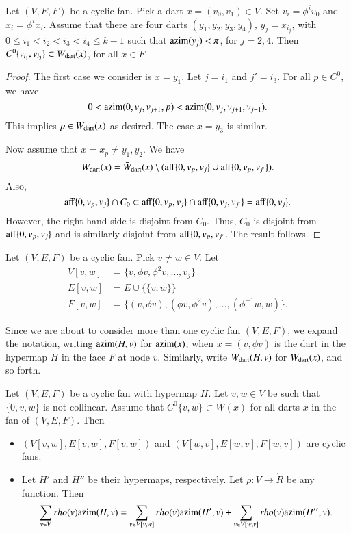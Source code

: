 \begin{lemma}  Let $(V,E,F)$ be a cyclic fan.  Pick a dart $x=(v_0,v_1)\in V$.  Set $v_i = \phi^i v_0$ and $x_i = \phi^i x_i$.  Assume that there are four darts $(y_1,y_2,y_3,y_4)$, $y_j = x_{i_j}$, with
$0\le i_1 < i_2 < i_3 < i_4\le k-1$ 
such that ${\operatorname{azim}}(y_j) < \pi$, for $j=2,4$.  
Then $C^0\{v_{i_1},v_{i_3}\} \subset W_{\text{dart}}(x)$, for all $x\in F$.
\end{lemma}

\begin{proof} The first case we consider is $x=y_1$.  Let $j=i_1$ and $j' = i_3$. For all $p\in C^0$, we have
$$
0 < {\operatorname{azim}}(0,v_{j},v_{j+1},p) < {\operatorname{azim}}(0,v_j,v_{j+1},v_{j-1}).
$$  
This implies $p\in W_{\text{dart}}(x)$ as desired.  The case $x=y_3$ is similar.

Now assume that $x=x_p\ne y_1,y_2$.  We have
$$
W_{\text{dart}}(x) = \bar W_{\text{dart}}(x)\setminus ({\operatorname{aff}}\{0,v_p,v_j\}\cup{\operatorname{aff}}\{0,v_p,v_{j'}\}).
$$
Also, 
$$
{\operatorname{aff}}\{0,v_p,v_j\}\cap C_0 \subset {\operatorname{aff}}\{0,v_p,v_j\}\cap {\operatorname{aff}}\{0,v_j,v_{j'}\} = {\operatorname{aff}}\{0,v_j\}.
$$
However, the right-hand side is disjoint from $C_0$.  Thus, $C_0$ is disjoint from ${\operatorname{aff}}\{0,v_p,v_j\}$ and is similarly disjoint from ${\operatorname{aff}}\{0,v_p,v_{j'}$.  The result follows.
\end{proof}

\begin{definition} Let $(V,E,F)$ be a cyclic fan.  Pick $v\ne w\in V$.
Let
$$
\begin{array}{lll}
V[v,w] &= \{v,\phi v,\phi^2 v,\ldots,v_j\}\\
E[v,w] &= E \cup \{\{v,w\}\}\\
F[v,w] &= \{(v,\phi v),(\phi v,\phi^2 v),\ldots,(\phi^{-1}w,w)\}.
\end{array}
$$
\end{definition}

Since we are about to consider more than one cyclic fan $(V,E,F)$, we expand the notation, writing ${\operatorname{azim}}(H,v)$ for ${\operatorname{azim}}(x)$, when $x=(v,\phi v)$ is the dart in the hypermap $H$ in the face $F$ at node $v$.  Similarly, write $W_{\text{dart}}(H,v)$ for $W_{\text{dart}}(x)$, and so forth.

\begin{lemma}  Let $(V,E,F)$ be a cyclic fan with hypermap $H$.  Let $v,w\in V$ be such that $\{0,v,w\}$ is not collinear.  Assume that $C^0\{v,w\}\subset W(x)$ for all darts $x$ in the fan of $(V,E,F)$. Then
\begin{itemize}
\item $(V[v,w],E[v,w],F[v,w])$ and $(V[w,v],E[w,v],F[w,v])$ are cyclic fans.  
\item Let $H'$ and $H''$ be their hypermaps, respectively.  Let $\rho:V\to\ring{R}$ be any function.  Then
$$
\sum_{v\in V} rho(v){\operatorname{azim}}(H,v) = \sum_{v\in V[v,w]}rho(v){\operatorname{azim}}(H',v) + \sum_{v\in V[w,v]}rho(v){\operatorname{azim}}(H'',v).
$$
\end{itemize}
\end{lemma}


